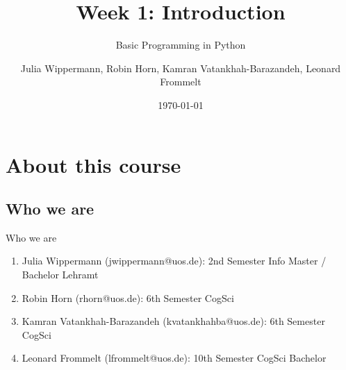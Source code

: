 
\usepackage{gensymb}
\usepackage{csquotes}
\usepackage{fontawesome}

\nocite{*}




\title[Introduction]{Week 1: Introduction}
\subtitle{Basic Programming in Python}

\author[Julia, Robin, Kamran, Leonard]{Julia Wippermann, Robin Horn, \newline Kamran Vatankhah-Barazandeh, Leonard Frommelt}

\date{\today}

\begin{frame}[plain]
    \titlepage
\end{frame}

\begin{frame}
    \tableofcontents
\end{frame}

\section{About this course}

\subsection{Who we are}

\begin{frame}{Who we are}

    \begin{enumerate}
        \item Julia Wippermann (jwippermann@uos.de):
        \newline 2nd Semester Info Master / Bachelor Lehramt
        \newline
        \item Robin Horn (rhorn@uos.de):
        \newline 6th Semester CogSci
        \newline
        \item Kamran Vatankhah-Barazandeh (kvatankhahba@uos.de):
        \newline 6th Semester CogSci
        \newline
        \item Leonard Frommelt (lfrommelt@uos.de):
        \newline 10th Semester CogSci Bachelor
    \end{enumerate}
\end{frame}

